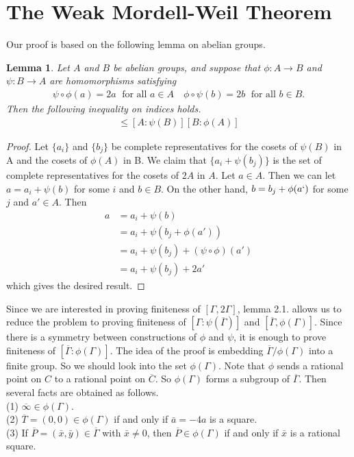 \documentclass[11pt]{article}
\newcommand{\<}{\langle}
\renewcommand{\>}{\rangle}
\numberwithin{equation}{section}
\theoremstyle{plain}
\newtheorem{lemma}[thm]{Lemma}
\theoremstyle{definition}
\begin{document}
\section{The Weak Mordell-Weil Theorem} \label{section-W}
    Our proof is based on the following lemma on abelian groups.
    \begin{lemma} Let \(A\) and \(B\) be abelian groups, and suppose that \( \phi: A \rightarrow B \) and     \( \psi: B \rightarrow A \) are homomorphisms satisfying 
        \begin{align*}
            \psi \circ \phi (a) = 2a \; \text{ for all } a \in A \quad \phi \circ \psi (b) = 2b \; \text{ for all } b \in B. 
        \end{align*}
    Then the following inequality on indices holds.
        \begin{align*}
            [A:2A] \le [A:\psi(B)][B:\phi(A)]
        \end{align*}
    \end{lemma}
    \begin{proof}
        Let \(\{a_i\}\) and \(\{b_j\}\) be complete representatives for the cosets of \(\psi(B)\) in A and the cosets of \(\phi(A)\) in B. We claim that \(\{ a_i + \psi(b_j) \} \) is the set of complete representatives for the cosets of \(2A\) in \(A\). Let \(a \in A \). Then we can let \(a = a_i + \psi(b) \) for some \(i\) and \(b \in B \). On the other hand, \( b = b_j + \phi(a`) \) for some \(j\) and \(a' \in A \). Then
        \begin{align*}
            a &= a_i + \psi(b) \\
              &= a_i + \psi( b_j + \phi (a')) \\
              &= a_i + \psi( b_j) + (\psi \circ \phi )(a')\\
              &= a_i + \psi(b_j) + 2a'
        \end{align*}
        which gives the desired result.
    \end{proof}
    Since we are interested in proving finiteness of \( [\Gamma, 2\Gamma ]\), lemma 2.1. allows us to reduce the problem to proving finiteness of \( [\Gamma: \psi(\overline{\Gamma})] \) and \( [\overline{\Gamma}, \phi(\Gamma) ] \).  Since there is a symmetry between constructions of \( \phi \) and \( \psi \), it is enough to prove finiteness of \( [\overline{\Gamma}: \phi(\Gamma)] \). The idea of the proof is embedding \( \overline\Gamma / \phi(\Gamma)\) into a finite group. So we should look into the set \( \phi(\Gamma) \). Note that \( \phi \) sends a rational point on \(C\) to a rational point on \(\overline{C}\). So \( \phi(\Gamma) \) forms a subgroup of \(\overline{\Gamma} \). Then several facts are obtained as follows.\\
    (1) \( \overline{\infty} \in \phi(\Gamma) \). \\
    (2) \( \overline{T} = (0,0) \in \phi(\Gamma)\) if and only if \( \bar{a} = -4a \) is a square. \\
    (3) If \( \overline{P} = (\bar{x},\bar{y}) \in \overline{\Gamma}\) with \(\bar{x} \ne 0\), then \( \overline{P} \in \phi(\Gamma)\) if and only if \( \bar{x} \) is a rational square. 
\end{document}
